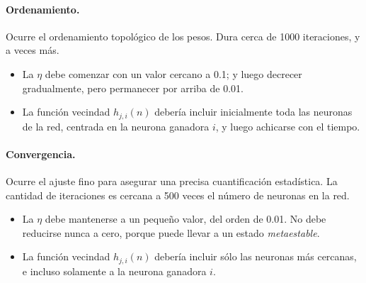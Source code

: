 \documentclass[10pt,a4paper]{article}
\begin{document}
\begin{multicols}{2}
\paragraph{Ordenamiento.} Ocurre el ordenamiento topológico de los pesos. Dura cerca de 1000 iteraciones, y a veces más.
\begin{itemize}
\item La $\eta$ debe comenzar con un valor cercano a 0.1; y luego decrecer gradualmente, pero permanecer por arriba de 0.01.
\item La función vecindad $h_{j,i}(n)$ debería incluir inicialmente toda las neuronas de la red, centrada en la neurona ganadora $i$, y luego achicarse con el tiempo.
\end{itemize}

\paragraph{Convergencia.} Ocurre el ajuste fino para asegurar una precisa cuantificación estadística. La cantidad de iteraciones es cercana a 500 veces el número de neuronas en la red.
\begin{itemize}
\item La $\eta$ debe mantenerse a un pequeño valor, del orden de 0.01. No debe reducirse nunca a cero, porque puede llevar a un estado \textit{metaestable}.
\item La función vecindad $h_{j,i}(n)$ debería incluir sólo las neuronas más cercanas, e incluso solamente a la neurona ganadora $i$.
\end{itemize}
\end{multicols}
\end{document}
